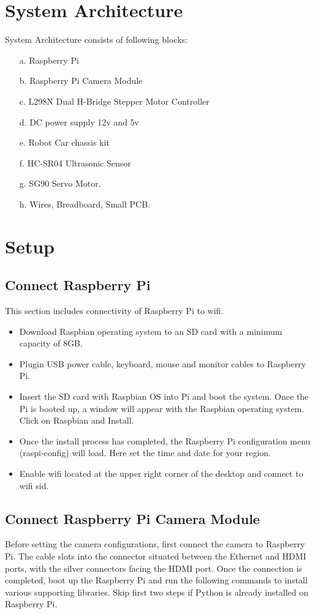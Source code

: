 \section{System Architecture}
System Architecture consists of following blocks:

\begin{itemize}
\item[a.] Raspberry Pi
\item[b.] Raspberry Pi Camera Module
\item[c.] L298N Dual H-Bridge Stepper Motor Controller
\item[d.] DC power supply 12v and 5v
\item[e.] Robot Car chassis kit
\item[f.] HC-SR04 Ultrasonic Sensor
\item[g.] SG90 Servo Motor.
\item[h.] Wires, Breadboard, Small PCB.
\end{itemize}


\section{Setup}
\subsection{Connect Raspberry Pi}
This section includes connectivity of Raspberry Pi to wifi. 

\begin{itemize}
\item Download Raspbian operating system to an SD card with a minimum 
capacity of 8GB.
\item Plugin USB power cable, keyboard, mouse and monitor cables to 
Raspberry Pi. 
\item Insert the SD card with Raspbian OS into Pi and boot the system. 
Once the Pi is booted up, a window will appear with the Raspbian 
operating system. Click on Raspbian and Install.
\item Once the install process has completed, the Raspberry Pi configuration 
menu (raspi-config) will load. Here set the time and date for your region.
\item Enable wifi located at the upper right corner of the desktop and connect 
to wifi sid.
\end{itemize}


\subsection{Connect Raspberry Pi Camera Module}
Before setting the camera configurations, first connect the camera to 
Raspberry Pi. The cable slots into the connector situated between the 
Ethernet and HDMI ports, with the silver connectors facing the HDMI port. 
Once the connection is completed, boot up the Raspberry Pi and run the 
following commands to install various supporting libraries. 
Skip first two steps if Python is already installed on Raspberry Pi.

